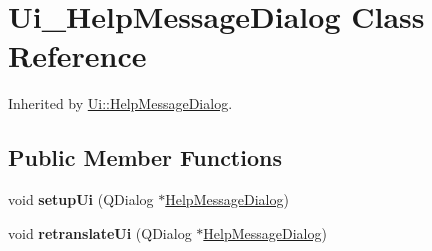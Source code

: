 \hypertarget{class_ui___help_message_dialog}{}\section{Ui\+\_\+\+Help\+Message\+Dialog Class Reference}
\label{class_ui___help_message_dialog}


Inherited by \mbox{\hyperlink{class_ui_1_1_help_message_dialog}{Ui\+::\+Help\+Message\+Dialog}}.

\subsection*{Public Member Functions}
\begin{DoxyCompactItemize}
\item 
\mbox{\label{class_ui___help_message_dialog_a4fc6a1d13f2c81262d055b8b8868d542}} 
void {\bfseries setup\+Ui} (Q\+Dialog $\ast$\mbox{\hyperlink{class_help_message_dialog}{Help\+Message\+Dialog}})
\item 
\mbox{\label{class_ui___help_message_dialog_a537a65cdbd8cb9b898f896ffe41d120c}} 
void {\bfseries retranslate\+Ui} (Q\+Dialog $\ast$\mbox{\hyperlink{class_help_message_dialog}{Help\+Message\+Dialog}})
\end{DoxyCompactItemize}

